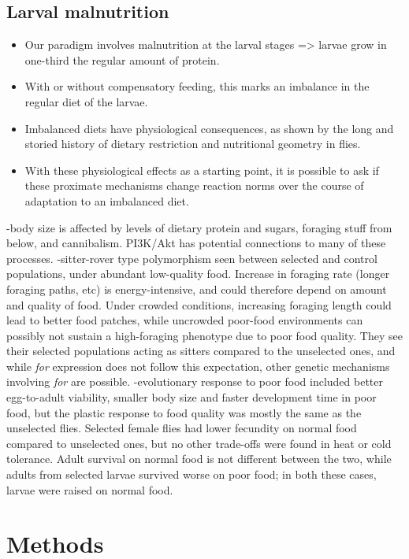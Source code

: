 \documentclass[12pt,onecolumn,twoside]{article}
\begin{document}
	\subsection{Larval malnutrition}
	\begin{itemize}
		\item Our paradigm involves malnutrition at the larval stages => larvae grow in one-third the regular amount of protein.
		\item With or without compensatory feeding, this marks an imbalance in the regular diet of the larvae.
		\item Imbalanced diets have physiological consequences, as shown by the long and storied history of dietary restriction and nutritional geometry in flies.
		\item With these physiological effects as a starting point, it is possible to ask if these proximate mechanisms change reaction norms over the course of adaptation to an imbalanced diet.
	\end{itemize}
	\citep{Ahmad2018}-body size is affected by levels of dietary protein and sugars, foraging stuff from below, and cannibalism. PI3K/Akt has potential connections to many of these processes.
	\citep{Vijendravarma2012}-sitter-rover type polymorphism seen between selected and control populations, under abundant low-quality food. Increase in foraging rate (longer foraging paths, etc) is energy-intensive, and could therefore depend on amount and quality of food. Under crowded conditions, increasing foraging length could lead to better food patches, while uncrowded poor-food environments can possibly not sustain a high-foraging phenotype due to poor food quality. They see their selected populations acting as sitters compared to the unselected ones, and while \textit{for} expression does not follow this expectation, other genetic mechanisms involving \textit{for} are possible.
	\citep{Kolss2009}-evolutionary response to poor food included better egg-to-adult viability, smaller body size and faster development time in poor food, but the plastic response to food quality was mostly the same as the unselected flies. Selected female flies had lower fecundity on normal food compared to unselected ones, but no other trade-offs were found in heat or cold tolerance. Adult survival on normal food is not different between the two, while adults from selected larvae survived worse on poor food; in both these cases, larvae were raised on normal food.
	\section{Methods}
\end{document}
